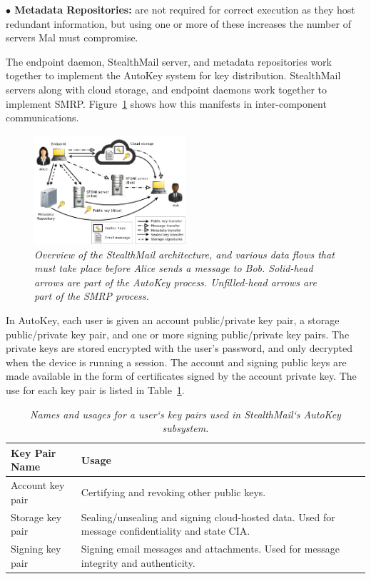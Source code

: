 {\bf $\bullet$ Metadata Repositories:} are not required for correct execution as they host redundant information, but using one or more of these increases the number of servers Mal must compromise.\vspace{0.5em}

The endpoint daemon, StealthMail server, and metadata repositories work together to implement the AutoKey system for key distribution. StealthMail servers along with cloud storage, and endpoint daemons work together to implement SMRP.  Figure~\ref{fig:overview} shows how this manifests in inter-component communications.

\begin{figure}[h!]
\centering
\includegraphics[width=0.5\textwidth]{figures/overview}
\caption{\it Overview of the StealthMail architecture, and various data flows that must take place before Alice sends a message to Bob.  Solid-head arrows are part of the AutoKey process.  Unfilled-head arrows are part of the SMRP process.}
\label{fig:overview}
\end{figure}


In AutoKey, each user is given an account public/private key pair, a storage public/private key pair, and one or more signing public/private key pairs.  The private keys are stored encrypted with the user’s password, and only decrypted when the device is running a session.  The account and signing public keys are made available in the form of certificates signed by the account private key.  The use for each key pair is listed in Table~\ref{tab:keypairs}.

\begin{table}[ht!]
\begin{tabular}{ | l | p{14cm} |}
\hline
\textbf{Key Pair Name} & \textbf{Usage} \\
\hline
Account key pair & Certifying and revoking other public keys. \\
Storage key pair & Sealing/unsealing and signing cloud-hosted data.  Used for message confidentiality and state CIA. \\
Signing key pair & Signing email messages and attachments.  Used for message integrity and authenticity. \\
\hline
\end{tabular}
\caption{\it Names and usages for a user`s key pairs used in StealthMail`s AutoKey subsystem.}
\label{tab:keypairs}
\end{table}


